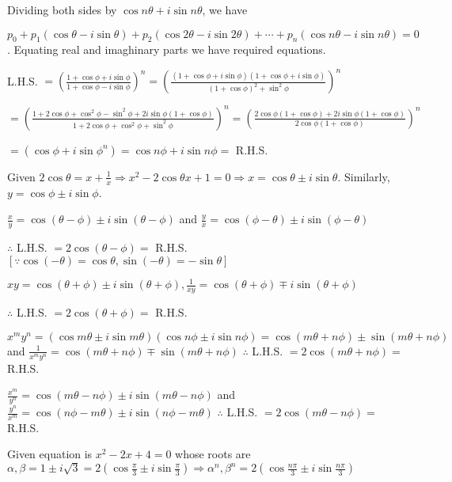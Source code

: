   Dividing both sides by $\cos n\theta + i\sin n\theta$, we have

  $p_0 + p_1(\cos\theta - i\sin\theta) + p_2(\cos2\theta - i\sin2\theta) + \cdots + p_n(\cos n\theta - i\sin
  n\theta) = 0$. Equating real and imaghinary parts we have required equations.
\item L.H.S. $= \left(\frac{1 + \cos \phi + i \sin\phi}{1 + \cos \phi - i\sin\phi}\right)^n = \left(\frac{(1
  + \cos\phi + i \sin\phi)(1 + \cos\phi + i\sin\phi)}{(1 + \cos\phi)^2 + \sin^2\phi}\right)^n$

  $= \left(\frac{1+ 2\cos\phi + \cos^2\phi - \sin^2\phi + 2i \sin\phi(1 + \cos\phi)}{1 + 2\cos\phi +
  \cos^2\phi + \sin^2\phi}\right)^n= \left(\frac{2\cos\phi(1 + \cos\phi) + 2i \sin\phi(1 +
  \cos\phi)}{2\cos\phi(1 + \cos\phi)}\right)^n$

  $= (\cos\phi + i \sin\phi^n) = \cos n\phi + i \sin n\phi =$ R.H.S.
\item Given $2\cos\theta = x + \frac{1}{x} \Rightarrow x^2 - 2\cos\theta x + 1 = 0 \Rightarrow x =
  \cos\theta\pm i\sin\theta$. Similarly, $y = \cos\phi\pm i\sin\phi$.
  \startitemize[i]
  \item $\frac{x}{y} = \cos(\theta - \phi) \pm i\sin(\theta - \phi)$ and $\frac{y}{x} = \cos(\phi -
    \theta)\pm i\sin(\phi - \theta)$

    $\therefore$ L.H.S. $= 2\cos(\theta - \phi) =$ R.H.S. $[\because \cos(-\theta) = \cos\theta,
      \sin(-\theta) = -\sin\theta]$
  \item $xy = \cos(\theta + \phi) \pm i\sin(\theta + \phi), \frac{1}{xy} = \cos(\theta + \phi)\mp
    i\sin(\theta + \phi)$

    $\therefore$ L.H.S. $= 2\cos(\theta + \phi) =$ R.H.S.
  \item $x^my^n = (\cos m\theta \pm i\sin m\theta)(\cos n\phi \pm i\sin n\phi) = \cos(m\theta + n\phi)\pm
    \sin(m\theta + n\phi)$ and $\frac{1}{x^my^n} = \cos(m\theta + n\phi)\mp \sin(m\theta + n\phi)$
    $\therefore$ L.H.S. $= 2\cos(m\theta + n\phi) =$ R.H.S.
  \item $\frac{x^m}{y^n} = \cos(m\theta - n\phi)\pm i\sin(m\theta - n\phi)$ and $\frac{y^n}{x^m} =
    \cos(n\phi - m\theta)\pm i\sin(n\phi - m\theta)$
    $\therefore$ L.H.S. $= 2\cos(m\theta - n\phi) =$ R.H.S.
  \stopitemize
\item Given equation is $x^2 - 2x + 4 = 0$ whose roots are $\alpha, \beta = 1\pm i\sqrt{3} =
  2\left(\cos\frac{\pi}{3}\pm i\sin\frac{\pi}{3}\right)\Rightarrow \alpha^n, \beta^n =
  2\left(\cos\frac{n\pi}{3}\pm i\sin\frac{n\pi}{3}\right)$

